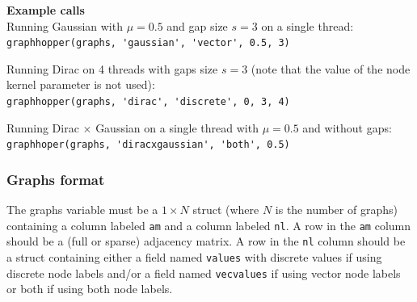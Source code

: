 \documentclass{article}
\begin{document}
\begin{appendices}
\textbf{Example calls}\\
Running Gaussian with $\mu=0.5$ and gap size $s=3$ on a single thread:\\
\verb|graphhopper(graphs, 'gaussian', 'vector', 0.5, 3)|

Running Dirac on 4 threads with gaps size $s=3$ (note that the value of the node kernel parameter is not used):\\
\verb|graphhopper(graphs, 'dirac', 'discrete', 0, 3, 4)|

Running Dirac $\times$ Gaussian on a single thread with $\mu=0.5$ and without gaps:\\
\verb|graphhoper(graphs, 'diracxgaussian', 'both', 0.5)|


\subsubsection{Graphs format}
\label{appendix:graphs-format}
The graphs variable must be a $1\times N$ struct (where $N$ is the number of graphs) containing a column labeled \verb|am| and a column labeled \verb|nl|. A row in the \verb|am| column should be a (full or sparse) adjacency matrix. A row in the \verb|nl| column should be a struct containing either a field named \verb|values| with discrete values if using discrete node labels and/or a field named \verb|vecvalues| if using vector node labels or both if using both node labels.

\end{appendices}
\end{document}
